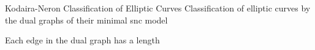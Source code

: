 \begin{frame}{Kodaira-Neron Classification of Elliptic Curves}
	Classification of elliptic curves by the dual graphs of their minimal snc model
		\pause
	\begin{figure}[ht]
    \centering
\end{figure}
\end{frame}

\begin{frame}
	Each edge in the dual graph has a length
\begin{figure}[ht]
    \centering
\end{figure}
\end{frame}





